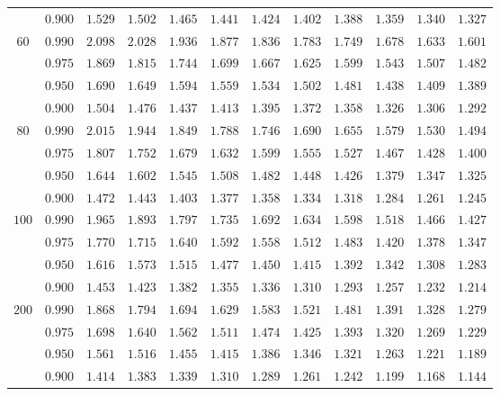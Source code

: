 \documentclass[11pt]{article}
\theoremstyle{definition}
\begin{document}
\begin{table}[H]
\begin{tabularx}{\linewidth}{c | c | c c c c c c c c c c}
		& $0.900$ & $1.529$ & $1.502$ & $1.465$ & $1.441$ & $1.424$ & $1.402$ & $1.388$ & $1.359$ & $1.340$ & $1.327$ \\
		$60$ & $0.990$ & $2.098$ & $2.028$ & $1.936$ & $1.877$ & $1.836$ & $1.783$ & $1.749$ & $1.678$ & $1.633$ & $1.601$ \\
		& $0.975$ & $1.869$ & $1.815$ & $1.744$ & $1.699$ & $1.667$ & $1.625$ & $1.599$ & $1.543$ & $1.507$ & $1.482$ \\
		& $0.950$ & $1.690$ & $1.649$ & $1.594$ & $1.559$ & $1.534$ & $1.502$ & $1.481$ & $1.438$ & $1.409$ & $1.389$ \\
		& $0.900$ & $1.504$ & $1.476$ & $1.437$ & $1.413$ & $1.395$ & $1.372$ & $1.358$ & $1.326$ & $1.306$ & $1.292$ \\
		$80$ & $0.990$ & $2.015$ & $1.944$ & $1.849$ & $1.788$ & $1.746$ & $1.690$ & $1.655$ & $1.579$ & $1.530$ & $1.494$ \\
		& $0.975$ & $1.807$ & $1.752$ & $1.679$ & $1.632$ & $1.599$ & $1.555$ & $1.527$ & $1.467$ & $1.428$ & $1.400$ \\
		& $0.950$ & $1.644$ & $1.602$ & $1.545$ & $1.508$ & $1.482$ & $1.448$ & $1.426$ & $1.379$ & $1.347$ & $1.325$ \\
		& $0.900$ & $1.472$ & $1.443$ & $1.403$ & $1.377$ & $1.358$ & $1.334$ & $1.318$ & $1.284$ & $1.261$ & $1.245$ \\
		$100$ & $0.990$ & $1.965$ & $1.893$ & $1.797$ & $1.735$ & $1.692$ & $1.634$ & $1.598$ & $1.518$ & $1.466$ & $1.427$ \\
		& $0.975$ & $1.770$ & $1.715$ & $1.640$ & $1.592$ & $1.558$ & $1.512$ & $1.483$ & $1.420$ & $1.378$ & $1.347$ \\
		& $0.950$ & $1.616$ & $1.573$ & $1.515$ & $1.477$ & $1.450$ & $1.415$ & $1.392$ & $1.342$ & $1.308$ & $1.283$ \\
		& $0.900$ & $1.453$ & $1.423$ & $1.382$ & $1.355$ & $1.336$ & $1.310$ & $1.293$ & $1.257$ & $1.232$ & $1.214$ \\
		$200$ & $0.990$ & $1.868$ & $1.794$ & $1.694$ & $1.629$ & $1.583$ & $1.521$ & $1.481$ & $1.391$ & $1.328$ & $1.279$ \\
		& $0.975$ & $1.698$ & $1.640$ & $1.562$ & $1.511$ & $1.474$ & $1.425$ & $1.393$ & $1.320$ & $1.269$ & $1.229$ \\
		& $0.950$ & $1.561$ & $1.516$ & $1.455$ & $1.415$ & $1.386$ & $1.346$ & $1.321$ & $1.263$ & $1.221$ & $1.189$ \\
		& $0.900$ & $1.414$ & $1.383$ & $1.339$ & $1.310$ & $1.289$ & $1.261$ & $1.242$ & $1.199$ & $1.168$ & $1.144$ \\

\end{tabularx}
\end{table}
\end{document}
